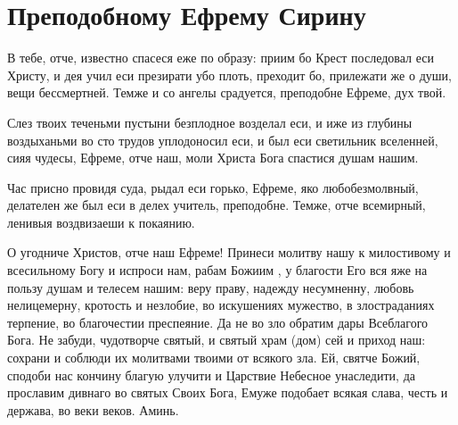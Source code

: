 \section{Преподобному Ефрему Сирину}\begin{mymulticols}


В тебе, отче, известно спасеся еже по образу: приим бо Крест последовал еси Христу, и дея учил еси презирати убо плоть, преходит бо, прилежати же о души, вещи бессмертней. Темже и со ангелы срадуется, преподобне Ефреме, дух твой.


Слез твоих теченьми пустыни безплодное возделал еси, и иже из глубины воздыханьми во сто трудов уплодоносил еси, и был еси светильник вселенней, сияя чудесы, Ефреме, отче наш, моли Христа Бога спастися душам нашим.


Час присно провидя суда, рыдал еси горько, Ефреме, яко любобезмолвный, делателен же был еси в делех учитель, преподобне. Темже, отче всемирный, ленивыя воздвизаеши к покаянию.


О угодниче Христов, отче наш Ефреме! Принеси молитву нашу к милостивому и всесильному Богу и испроси нам, рабам Божиим , у благости Его вся яже на пользу душам и телесем нашим: веру праву, надежду несумненну, любовь нелицемерну, кротость и незлобие, во искушениях мужество, в злостраданиях терпение, во благочестии преспеяние. Да не во зло обратим дары Всеблагого Бога. Не забуди, чудотворче святый, и святый храм (дом) сей и приход наш: сохрани и соблюди их молитвами твоими от всякого зла. Ей, святче Божий, сподоби нас кончину благую улучити и Царствие Небесное унаследити, да прославим дивнаго во святых Своих Бога, Емуже подобает всякая слава, честь и держава, во веки веков. Аминь.

\end{mymulticols}

\mychapterending


